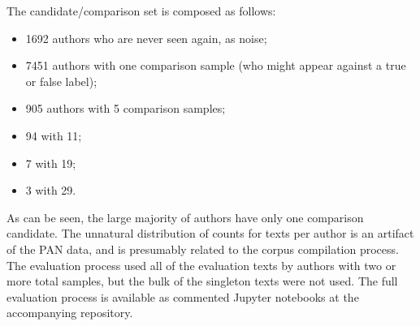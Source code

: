 \documentclass[
    hf
]{ceurart}
\begin{document}
The candidate/comparison set is composed as follows:
\begin{itemize}
    \item 1692 authors who are never seen again, as noise;
    \item 7451 authors with one comparison sample (who might appear against a true or false label);
    \item 905 authors with 5 comparison samples;
    \item 94 with 11;
    \item 7 with 19;
    \item 3 with 29.
\end{itemize}
As can be seen, the large majority of authors have only one comparison candidate. The unnatural
distribution of counts for texts per author is an artifact of the PAN data, and is presumably
related to the corpus compilation process. The evaluation process used all of the evaluation texts
by authors with two or more total samples, but the bulk of the singleton texts were not used. The full
evaluation process is available as commented Jupyter notebooks at the accompanying repository.
\end{document}
